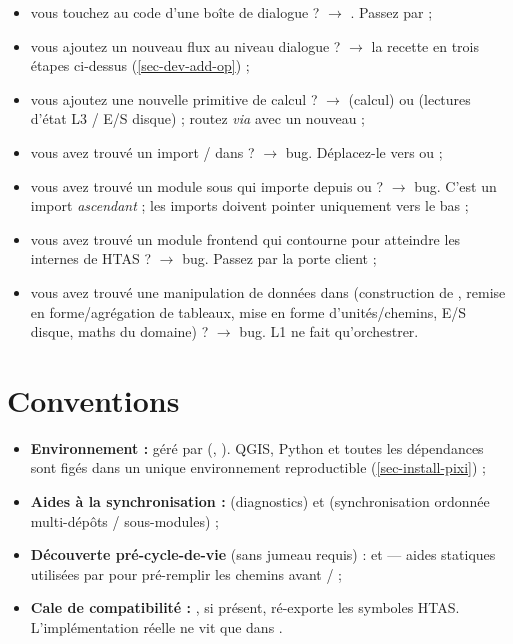 \begin{itemize}
    \item vous touchez au code d'une boîte de dialogue ? $\rightarrow$ . Passez par  ;
    \item vous ajoutez un nouveau flux au niveau dialogue ? $\rightarrow$ la recette en trois étapes ci-dessus (\cref{sec-dev-add-op}) ;
    \item vous ajoutez une nouvelle primitive de calcul ? $\rightarrow$  (calcul) ou  (lectures d'état L3 / E/S disque) ; routez \textit{via}  avec un nouveau  ;
    \item vous avez trouvé un import  /  dans  ? $\rightarrow$ bug. Déplacez-le vers  ou  ;
    \item vous avez trouvé un module sous  qui importe depuis  ou  ? $\rightarrow$ bug. C'est un import \emph{ascendant} ; les imports doivent pointer uniquement vers le bas ;
    \item vous avez trouvé un module frontend qui contourne  pour atteindre les internes de HTAS ? $\rightarrow$ bug. Passez par la porte client ;
    \item vous avez trouvé une manipulation de données dans  (construction de , remise en forme/agrégation de tableaux, mise en forme d'unités/chemins, E/S disque, maths du domaine) ? $\rightarrow$ bug. L1 ne fait qu'orchestrer.
\end{itemize}

\section{Conventions}
\label{sec-dev-conventions}

\begin{itemize}
    \item \textbf{Environnement :} géré par  (, ). QGIS, Python et toutes les dépendances sont figés dans un unique environnement reproductible (\cref{sec-install-pixi}) ;
    \item \textbf{Aides à la synchronisation :}  (diagnostics) et  (synchronisation ordonnée multi-dépôts / sous-modules) ;
    \item \textbf{Découverte pré-cycle-de-vie} (sans jumeau requis) :  et  --- aides statiques utilisées par  pour pré-remplir les chemins avant  /  ;
    \item \textbf{Cale de compatibilité :} , si présent, ré-exporte les symboles HTAS. L'implémentation réelle ne vit que dans .
\end{itemize}

